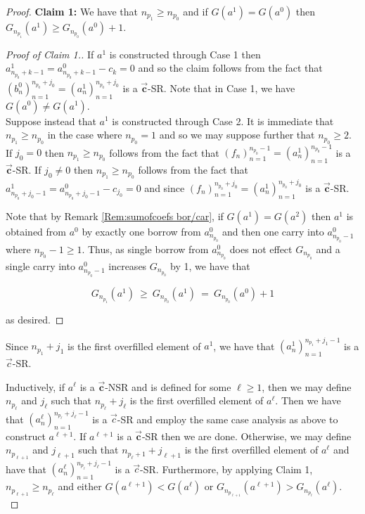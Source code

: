 \documentclass[10pt,a4paper]{amsart}
\newcommand{\vtr}[1]{\vec{\mathbf{#1}}}
\begin{document}
\begin{proof}
\noindent \textbf{Claim 1:} We have that $n_{p_1}\geq n_{p_0}$ and if $G(a^1)=G(a^0)$ then $G_{n_{p_1}}(a^1)\geq G_{n_{p_0}}(a^0)+1$.\\

\begin{proof}[Proof of Claim 1.]
    If $a^1$ is constructed through Case 1 then $a^{1}_{n_{p_0}+k-1}=a^{0}_{n_{p_0}+k-1}-c_k=0$ and so the claim follows from the fact that $(b^0_n)_{n=1}^{n_{p_0}+j_0}=(a^1_n)_{n=1}^{n_{p_0}+j_0}$ is a $\vtr{c}$-SR. Note that in Case 1, we have $G(a^0)\neq G(a^1)$.\\

    Suppose instead that $a^1$ is constructed through Case 2. It is immediate that $n_{p_1}\geq n_{p_0}$ in the case where $n_{p_0}=1$ and so we may suppose further that $n_{p_0}\geq 2$. If $j_0=0$ then $n_{p_1}\geq n_{p_0}$ follows from the fact that $(f_n)_{n=1}^{n_{p_0}-1}=(a_n^1)_{n=1}^{n_{p_0}-1}$ is a $\vtr{c}$-SR. If $j_0\neq 0$ then $n_{p_1}\geq n_{p_0}$ follows from the fact that $a^{1}_{n_{p_0}+j_0-1}=a^{0}_{n_{p_0}+j_0-1}-c_{j_0}=0$ and since $(f_n)_{n=1}^{n_{p_0}+j_0}=(a_n^1)_{n=1}^{n_{p_0}+j_0}$ is a $\vtr{c}$-SR.

    Note that by Remark \textcolor{blue}{\ref{Rem:sumofcoefs bor/car}}, if $G(a^1)=G(a^2)$ then $a^1$ is obtained from $a^0$ by exactly one borrow from $a^0_{n_{p_0}}$ and then one carry into $a^{0}_{n_{p_0}-1}$ where $n_{p_0}-1\geq 1$. Thus, as single borrow from $a^0_{n_{p_0}}$ does not effect $G_{n_{p_0}}$ and a single carry into $a^{0}_{n_{p_0}-1}$ increases $G_{n_{p_0}}$ by 1, we have that

    $$G_{n_{p_1}}(a^1)\ \geq\  G_{n_{p_0}}(a^1)\ =\ G_{n_{p_0}}(a^0)+1$$

    \noindent as desired.
\end{proof}

Since $n_{p_1}+j_1$ is the first overfilled element of $a^1$, we have that $(a_n^1)_{n=1}^{n_{p_1} + j_1-1}$ is a $\vec{c}$-SR.

Inductively, if $a^{\ell}$ is a $\vtr{c}$-NSR and is defined for some $\ell\geq 1$, then we may define $n_{p_{\ell}}$ and $j_{\ell}$ such that $n_{p_\ell}+j_\ell$ is the first overfilled element of $a^\ell$. Then we have that $(a_n^\ell)_{n=1}^{n_{p_\ell} + j_\ell-1}$ is a $\vec{c}$-SR and employ the same case analysis as above to construct $a^{\ell+1}$. If $a^{\ell+1}$ is a $\vtr{c}$-SR then we are done. Otherwise, we may define $n_{p_{\ell+1}}$ and $j_{\ell+1}$ such that $n_{p_\ell+1}+j_{\ell+1}$ is the first overfilled element of $a^\ell$ and have that $(a_n^\ell)_{n=1}^{n_{p_\ell} + j_\ell-1}$ is a $\vec{c}$-SR. Furthermore, by applying Claim 1, $n_{p_{\ell+1}}\geq n_{p_{\ell}}$ and either $G(a^{\ell+1})<G(a^{\ell})$ or $G_{n_{p_{\ell+1}}}(a^{\ell+1})>G_{n_{p_{\ell}}}(a^{\ell})$.\\


\end{proof}
\end{document}
